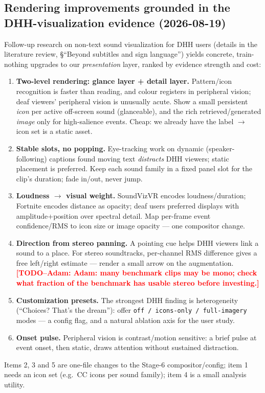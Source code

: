 \documentclass[11pt,a4paper]{article}
\newcommand{\TODO}[1]{\textcolor{red}{\textbf{[TODO--Adam: #1]}}}
\begin{document}
\subsection{Rendering improvements grounded in the DHH-visualization evidence (2026-08-19)}
Follow-up research on non-text sound visualization for DHH users (details in the literature review,
\S``Beyond subtitles and sign language'') yields concrete, train-nothing upgrades to our
\emph{presentation} layer, ranked by evidence strength and cost:
\begin{enumerate}
  \item \textbf{Two-level rendering: glance layer + detail layer.} Pattern/icon recognition is faster
    than reading, and colour registers in peripheral vision; deaf viewers' peripheral vision is
    unusually acute. Show a small persistent \emph{icon} per active off-screen sound (glanceable),
    and the rich retrieved/generated \emph{image} only for high-salience events. Cheap: we already
    have the label $\to$ icon set is a static asset.
  \item \textbf{Stable slots, no popping.} Eye-tracking work on dynamic (speaker-following) captions
    found moving text \emph{distracts} DHH viewers; static placement is preferred. Keep each sound
    family in a fixed panel slot for the clip's duration; fade in/out, never jump.
  \item \textbf{Loudness $\to$ visual weight.} SoundVizVR encodes loudness/duration; Fortnite encodes
    distance as opacity; deaf users preferred displays with amplitude+position over spectral detail.
    Map per-frame event confidence/RMS to icon size or image opacity --- one compositor change.
  \item \textbf{Direction from stereo panning.} A pointing cue helps DHH viewers link a sound to a
    place. For stereo soundtracks, per-channel RMS difference gives a free left/right estimate ---
    render a small arrow on the augmentation. \TODO{Adam: many benchmark clips may be mono; check
    what fraction of the benchmark has usable stereo before investing.}
  \item \textbf{Customization presets.} The strongest DHH finding is heterogeneity (``Choices? That's
    the dream''): offer \texttt{off / icons-only / full-imagery} modes --- a config flag, and a
    natural ablation axis for the user study.
  \item \textbf{Onset pulse.} Peripheral vision is contrast/motion sensitive: a brief pulse at event
    onset, then static, draws attention without sustained distraction.
\end{enumerate}
Items 2, 3 and 5 are one-file changes to the Stage-6 compositor/config; item 1 needs an icon set
(e.g.\ CC icons per sound family); item 4 is a small analysis utility.
\end{document}
